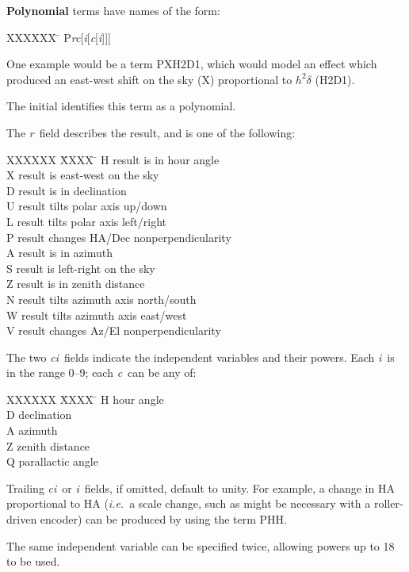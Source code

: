 {\bf Polynomial} terms have names of the form:
\begin{tabs}
XXXXXX \= \kill
\> P{\it rc}[{\it i}[{\it c}[{\it i}]]]
\end{tabs}
One example would be a term PXH2D1, which would model an effect
which produced an east-west shift on the sky (X) proportional
to $h^2\delta$ (H2D1).

The initial  identifies this term as a polynomial.

The {\it r}\, field describes the result, and is one of the following:
\begin{tabs}
XXXXXX \= XXXX \= \kill
\> H \> result is in hour angle \\
\> X \> result is east-west on the sky \\
\> D \> result is in declination \\
\> U \> result tilts polar axis up/down \\
\> L \> result tilts polar axis left/right \\
\> P \> result changes HA/Dec nonperpendicularity \\
\> A \> result is in azimuth \\
\> S \> result is left-right on the sky \\
\> Z \> result is in zenith distance \\
\> N \> result tilts azimuth axis north/south \\
\> W \> result tilts azimuth axis east/west \\
\> V \> result changes Az/El nonperpendicularity
\end{tabs}
The two {\it ci}\, fields indicate the independent variables and
their powers.  Each {\it i}\, is in the range 0--9;
each {\it c}\, can be any of:
\begin{tabs}
XXXXXX \= XXXX \= \kill
\> H \> hour angle \\
\> D \> declination \\
\> A \> azimuth \\
\> Z \> zenith distance \\
\> Q \> parallactic angle
\end{tabs}
Trailing {\it ci}\, or {\it i}\, fields, if omitted, default
to unity.  For example, a change in HA proportional to HA
({\it i.e.}\ a scale change, such as might be necessary
with a roller-driven encoder) can be produced by using
the term PHH.

The same independent variable can be specified twice, allowing
powers up to 18 to be used.

